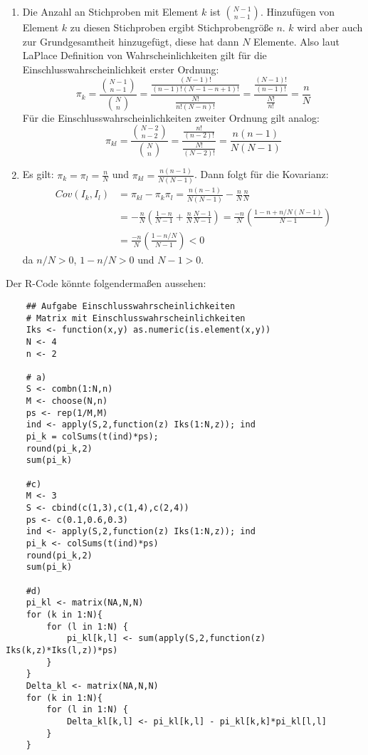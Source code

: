 \documentclass{article}
\begin{document}
\begin{solution}
		\begin{enumerate}
		\item Die Anzahl an Stichproben mit Element $k$ ist $\binom{N-1}{n-1}$. Hinzufügen von Element $k$ zu diesen Stichproben ergibt Stichprobengröße $n$. $k$ wird aber auch zur Grundgesamtheit hinzugefügt, diese hat dann $N$ Elemente. Also laut LaPlace Definition von Wahrscheinlichkeiten gilt für die Einschlusswahrscheinlichkeit erster Ordnung:
		$$\pi_k = \frac{\binom{N-1}{n-1}}{\binom{N}{n}} = \frac{\frac{(N-1)!}{(n-1)!(N-1-n+1)!}}{\frac{N!}{n!(N-n)!}}=\frac{\frac{(N-1)!}{(n-1)!}}{\frac{N!}{n!}}=\frac{n}{N}$$
		Für die Einschlusswahrscheinlichkeiten zweiter Ordnung gilt analog:
		$$\pi_{kl} = \frac{\binom{N-2}{n-2}}{\binom{N}{n}} = \frac{\frac{n!}{(n-2)!}}{\frac{N!}{(N-2)!}} = \frac{n(n-1)}{N(N-1)}$$
		\item Es gilt: $\pi_k = \pi_l = \frac{n}{N}$ und $\pi_{kl} = \frac{n(n-1)}{N(N-1)}$. Dann folgt für die Kovarianz:
		\begin{align*}
		Cov(I_k,I_l) &= \pi_{kl} - \pi_k \pi_l = \frac{n(n-1)}{N(N-1)} - \frac{n}{N}\frac{n}{N}\\
		&= -\frac{n}{N}\left(\frac{1-n}{N-1}+\frac{n}{N}\frac{N-1}{N-1}\right) = \frac{-n}{N}\left(\frac{1-n+n/N(N-1)}{N-1}\right) \\
		&= \frac{-n}{N}\left(\frac{1-n/N}{N-1}\right) <0
		\end{align*}
		da $n/N>0$, $1-n/N>0$ und $N-1 >0$.
	\end{enumerate}
    Der R-Code könnte folgendermaßen aussehen:
	\begin{lstlisting}
	## Aufgabe Einschlusswahrscheinlichkeiten
	# Matrix mit Einschlusswahrscheinlichkeiten
	Iks <- function(x,y) as.numeric(is.element(x,y))	
	N <- 4
	n <- 2
	
	# a)
	S <- combn(1:N,n)
	M <- choose(N,n)	
	ps <- rep(1/M,M)
	ind <- apply(S,2,function(z) Iks(1:N,z)); ind
	pi_k = colSums(t(ind)*ps);
	round(pi_k,2)
	sum(pi_k)
	
	#c)
	M <- 3
	S <- cbind(c(1,3),c(1,4),c(2,4))
	ps <- c(0.1,0.6,0.3)
	ind <- apply(S,2,function(z) Iks(1:N,z)); ind
	pi_k <- colSums(t(ind)*ps)
	round(pi_k,2)
	sum(pi_k)
	
	#d)
	pi_kl <- matrix(NA,N,N)
	for (k in 1:N){
		for (l in 1:N) {
			pi_kl[k,l] <- sum(apply(S,2,function(z) Iks(k,z)*Iks(l,z))*ps)
		}
	}
	Delta_kl <- matrix(NA,N,N)
	for (k in 1:N){
		for (l in 1:N) {
			Delta_kl[k,l] <- pi_kl[k,l] - pi_kl[k,k]*pi_kl[l,l]
		}
	}
	\end{lstlisting}

\end{solution}
\end{document}
